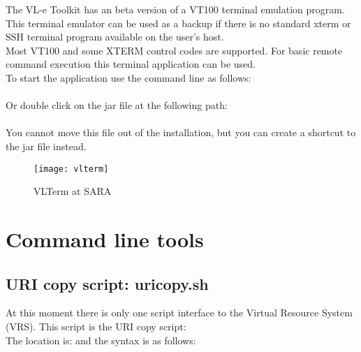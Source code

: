 The VL-e Toolkit has an beta version of a VT100 terminal emulation program.
This terminal emulator can be used as a backup if there is no standard xterm or SSH
terminal program available on the user's host.\\
Most VT100 and some XTERM control codes are supported. For basic remote
command execution this terminal application can be used.\\
To start the  application use the command line as follows:\\

	\tab {}\\

Or double click on the jar file at the following path:\\

	\tab {}\\

You cannot move this file out of the installation, but you can create a
shortcut to the jar file instead. \\ 

 \begin{figure}[htbp]
 \centerline{\texttt{[image: vlterm]}}
 \caption{VLTerm at SARA}
 \label{fig:vlterm}
 \end{figure}

\section{Command line tools}

\subsection{URI copy script: uricopy.sh}

At this moment there is only one script interface to the Virtual Resource System
(VRS). This script is the URI copy script: \\

The location is:  and the syntax is as
follows: 

\tab {}

